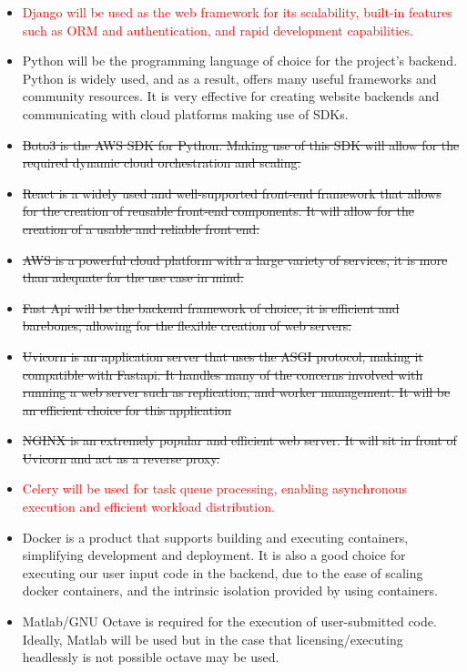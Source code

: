 \documentclass{article}
\begin{document}
\begin{itemize}
    \item \textcolor{red}{Django will be used as the web framework for its scalability, built-in features such as ORM and authentication, and rapid development capabilities.}
    \item Python will be the programming language of choice for the project's backend. Python is widely used, and as a result, offers many useful frameworks and community resources. It is very effective for creating website backends and communicating with cloud platforms making use of SDKs.
    \item \sout{Boto3 is the AWS SDK for Python. Making use of this SDK will allow for the required dynamic cloud orchestration and scaling.}
    \item \sout{React is a widely used and well-supported front-end framework that allows for the creation of reusable front-end components. It will allow for the creation of a usable and reliable front end.}
    \item \sout{AWS is a powerful cloud platform with a large variety of services, it is more than adequate for the use case in mind.}
    \item \sout{Fast Api will be the backend framework of choice, it is efficient and barebones, allowing for the flexible creation of web servers.}
    \item \sout{Uvicorn is an application server that uses the ASGI protocol, making it compatible with Fastapi. It handles many of the concerns involved with running a web server such as replication, and worker management. It will be an efficient choice for this application}
    \item \sout{NGINX is an extremely popular and efficient web server. It will sit in front of Uvicorn and act as a reverse proxy.}
    \item \textcolor{red}{Celery will be used for task queue processing, enabling asynchronous execution and efficient workload distribution.}
    \item Docker is a product that supports building and executing containers, simplifying development and deployment. It is also a good choice for executing our user input code in the backend, due to the ease of scaling docker containers, and the intrinsic isolation provided by using containers.
    \item Matlab/GNU Octave is required for the execution of user-submitted code. Ideally, Matlab will be used but in the case that licensing/executing headlessly is not possible octave may be used.

\end{itemize}
\end{document}
